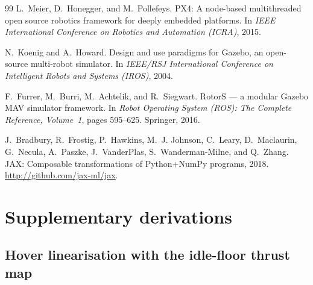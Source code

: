 \documentclass[11pt,a4paper,twoside,openright]{report}
\theoremstyle{plain}
\theoremstyle{definition}
\theoremstyle{remark}
\renewcommand{\chaptermark}[1]{\markboth{\chaptername\ \thechapter.\ #1}{}}
\begin{document}
\begin{thebibliography}{99}
		L.~Meier, D.~Honegger, and M.~Pollefeys.
		\newblock PX4: A node-based multithreaded open source robotics framework for
		deeply embedded platforms.
		\newblock In \emph{IEEE International Conference on Robotics and Automation
			(ICRA)}, 2015.

		N.~Koenig and A.~Howard.
		\newblock Design and use paradigms for Gazebo, an open-source multi-robot
		simulator.
		\newblock In \emph{IEEE/RSJ International Conference on Intelligent Robots and
			Systems (IROS)}, 2004.

		F.~Furrer, M.~Burri, M.~Achtelik, and R.~Siegwart.
		\newblock RotorS --- a modular Gazebo MAV simulator framework.
		\newblock In \emph{Robot Operating System (ROS): The Complete Reference,
			Volume~1}, pages 595--625. Springer, 2016.

		J.~Bradbury, R.~Frostig, P.~Hawkins, M.~J. Johnson, C.~Leary, D.~Maclaurin,
		G.~Necula, A.~Paszke, J.~VanderPlas, S.~Wanderman-Milne, and Q.~Zhang.
		\newblock JAX: Composable transformations of Python+NumPy programs, 2018.
		\newblock \url{http://github.com/jax-ml/jax}.

	\end{thebibliography}

	\cleardoublepage
	\appendix
	\renewcommand{\chaptermark}[1]{\markboth{\appendixname\ \thechapter.\ #1}{}}

	\chapter{Supplementary derivations}
	\label{app:derivations}

	\section{Hover linearisation with the idle-floor thrust map}
\end{document}
